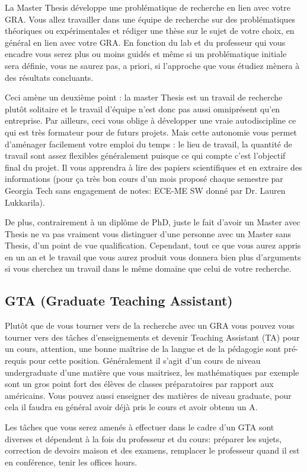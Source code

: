 \documentclass{article}
\begin{document}
La Master Thesis développe une problématique de recherche en lien avec votre GRA. Vous allez travailler dans une équipe de recherche sur des problématiques théoriques ou expérimentales et rédiger une thèse sur le sujet de votre choix, en général en lien avec votre GRA. En fonction du lab et du professeur qui vous encadre vous serez plus ou moins guidés et même si un problématique initiale sera définie, vous ne saurez pas, a priori, si l'approche que vous étudiez mènera à des résultats concluants. 

Ceci amène un deuxième point : la master Thesis est un travail de recherche plutôt solitaire et le travail d'équipe n'est donc pas aussi omniprésent qu'en entreprise. Par ailleurs, ceci vous oblige à développer une vraie autodiscipline ce qui est très formateur pour de futurs projets. Mais cette autonomie vous permet d'aménager facilement votre emploi du temps : le lieu de travail, la quantité de travail sont assez flexibles généralement puisque ce qui compte c'est l'objectif final du projet. 
Il vous apprendra à lire des papiers scientifiques et en extraire des informations (pour ça très bon cours d'un mois proposé chaque semestre par Georgia Tech sans engagement de notes: ECE-ME SW donné par Dr. Lauren Lukkarila). 

De plus, contrairement à un diplôme de PhD, juste le fait d'avoir un Master avec Thesis ne va pas vraiment vous distinguer d'une personne avec un Master sans Thesis, d'un point de vue qualification. Cependant, tout ce que vous aurez appris en un an et le travail que vous aurez produit vous donnera bien plus d'arguments si vous cherchez un travail dans le même domaine que celui de votre recherche.
\subsection{GTA (Graduate Teaching Assistant)}
Plutôt que de vous tourner vers de la recherche avec un GRA vous pouvez vous tourner vers des tâches d'enseignements et devenir Teaching Assistant (TA) pour un cours,  attention, une bonne maîtrise de la langue et de la pédagogie sont pré-requis pour cette position. Généralement il s'agit d'un cours de niveau undergraduate d'une matière que vous maitrisez, les mathématiques par exemple sont un gros point fort des élèves de classes préparatoires par rapport aux américains. Vous pouvez aussi enseigner des matières de niveau graduate, pour cela il faudra en général avoir déjà pris le cours et avoir obtenu un A. 

Les tâches que vous serez amenés à effectuer dans le cadre d'un GTA sont diverses et dépendent à la fois du professeur et du cours: préparer les sujets, correction de devoirs maison et des examens, remplacer le professeur quand il est en conférence, tenir les offices hours. 
\end{document}

